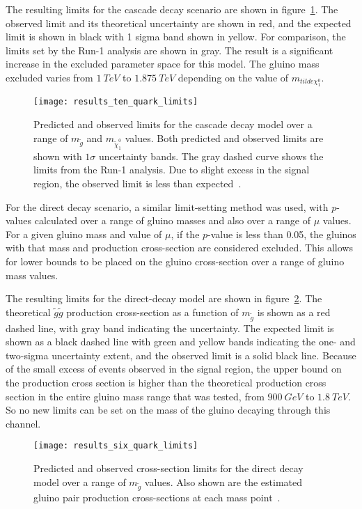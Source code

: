 The resulting limits for the cascade decay scenario are shown in figure~\ref{fig:results_ten_quark_limits}.
The observed limit and its theoretical uncertainty are shown in red, and the expected limit is shown in black with 1 sigma band shown in yellow.
For comparison, the limits set by the Run-1 analysis are shown in gray.
The result is a significant increase in the excluded parameter space for this model.
The gluino mass excluded varies from $1~TeV$ to $1.875~TeV$ depending on the value of $m_{tilde{\chi}_1^0}$.

\begin{figure}[!ht]
    \centering
    \texttt{[image: results\_ten\_quark\_limits]}
    \caption{Predicted and observed limits for the cascade decay model over a range of $m_{\tilde{g}}$ and $m_{\tilde{\chi}_1^0}$ values.
    Both predicted and observed limits are shown with $1\sigma$ uncertainty bands.
    The gray dashed curve shows the limits from the Run-1 analysis.
    Due to slight excess in the signal region, the observed limit is less than expected~\cite{paper-plb}.}
\label{fig:results_ten_quark_limits}
\end{figure}

For the direct decay scenario, a similar limit-setting method was used, with $p$-values calculated over a range of gluino masses and also over a range of $\mu$ values.
For a given gluino mass and value of $\mu$, if the $p$-value is less than 0.05, the gluinos with that mass and production cross-section are considered excluded.
This allows for lower bounds to be placed on the gluino cross-section over a range of gluino mass values.

The resulting limits for the direct-decay model are shown in figure~\ref{fig:results_six_quark_limits}.
The theoretical $\tilde{g}\tilde{g}$ production cross-section as a function of $m_{\tilde{g}}$ is shown as a red dashed line, with gray band indicating the uncertainty.
The expected limit is shown as a black dashed line with green and yellow bands indicating the one- and two-sigma uncertainty extent, and the observed limit is a solid black line.
Because of the small excess of events observed in the signal region, the upper bound on the production cross section is higher than the theoretical production cross section in the entire gluino mass range that was tested, from $900~GeV$ to $1.8~TeV$.
So no new limits can be set on the mass of the gluino decaying through this channel.

\begin{figure}[!ht]
    \centering
    \texttt{[image: results\_six\_quark\_limits]}
    \caption{Predicted and observed cross-section limits for the direct decay model over a range of $m_{\tilde{g}}$ values.
    Also shown are the estimated gluino pair production cross-sections at each mass point~\cite{paper-plb}.}
\label{fig:results_six_quark_limits}
\end{figure}
